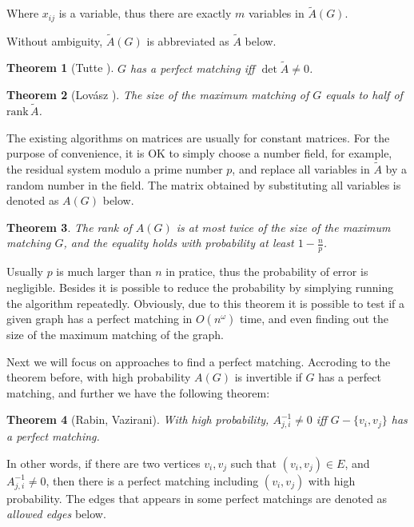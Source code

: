 \documentclass[a4paper]{article}
\newtheorem{theorem}{\hspace{2em}Theorem}
\begin{document}
			Where $x_{ij}$ is a variable, thus there are exactly $m$ variables in $\tilde A(G)$.

			Without ambiguity, $\tilde A(G)$ is abbreviated as $\tilde A$ below.

			\begin{theorem}[Tutte \cite{tuttetheorem}]
				$G$ has a perfect matching iff $\det \tilde A \neq 0$.
				\label{tutte}
			\end{theorem}

			\begin{theorem}[Lov\'asz \cite{lovasz}]
				The size of the maximum matching of $G$ equals to half of $\mathrm{rank}\, \tilde A$.
			\end{theorem}

			The existing algorithms on matrices are usually for constant matrices. For the purpose of convenience, it is OK to simply choose a number field, for example, the residual system modulo a prime number $p$, and replace all variables in $\tilde A$ by a random number in the field. The matrix obtained by substituting all variables is denoted as $A(G)$ below.

			\begin{theorem}
				The rank of $A(G)$ is at most twice of the size of the maximum matching $G$, and the equality holds with probability at least $1 - \frac n p$. 
			\end{theorem}

			Usually $p$ is much larger than $n$ in pratice, thus the probability of error is negligible. Besides it is possible to reduce the probability by simplying running the algorithm repeatedly. Obviously, due to this theorem it is possible to test if a given graph has a perfect matching in $O(n^\omega)$ time, and even finding out the size of the maximum matching of the graph.

			Next we will focus on approaches to find a perfect matching. Accroding to the theorem before, with high probability $A(G)$ is invertible if $G$ has a perfect matching, and further we have the following theorem:

			\begin{theorem}[Rabin, Vazirani]
				With high probability, $ A_{j, i} ^{-1} \ne 0 $ iff $ G - \{v_i, v_j\} $ has a perfect matching.
				\label{allowed}
			\end{theorem}

			In other words, if there are two vertices $v_i, v_j$ such that $(v_i, v_j) \in E$, and $A_{j, i}^{-1} \ne 0$, then there is a perfect matching including $(v_i, v_j)$ with high probability. The edges that appears in some perfect matchings are denoted as \emph{allowed edges} below.
\end{document}
